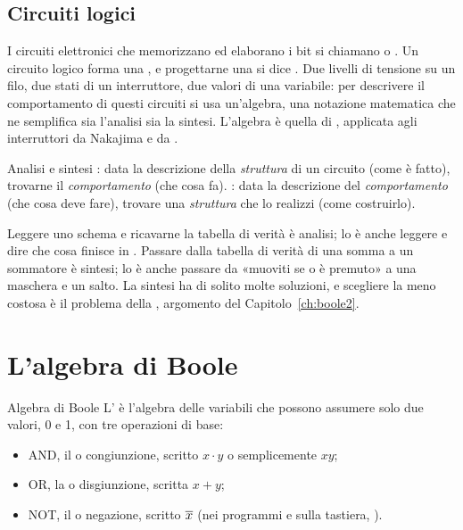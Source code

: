 \subsection{Circuiti logici}

I circuiti elettronici che memorizzano ed elaborano i bit si chiamano
 o . Un circuito logico
forma una , e progettarne una si dice
. Due livelli di tensione su un filo, due stati di un
interruttore, due valori di una variabile: per descrivere il comportamento di
questi circuiti si usa un'algebra, una notazione matematica che ne semplifica
sia l'analisi sia la sintesi. L'algebra è quella di \citet{boole1854},
applicata agli interruttori da Nakajima e da \citet{shannon1938}.

\begin{definition}{Analisi e sintesi}
: data la descrizione della \emph{struttura} di un circuito
(come è fatto), trovarne il \emph{comportamento} (che cosa fa).
: data la descrizione del \emph{comportamento} (che cosa deve
fare), trovare una \emph{struttura} che lo realizzi (come costruirlo).
\end{definition}

Leggere uno schema e ricavarne la tabella di verità è analisi; lo è anche
leggere  e dire che cosa finisce in . Passare
dalla tabella di verità di una somma a un sommatore è sintesi; lo è anche
passare da «muoviti se  o  è premuto» a una maschera e un
salto. La sintesi ha di solito molte soluzioni, e scegliere la meno costosa è
il problema della , argomento del
Capitolo~\ref{ch:boole2}.

\section{L'algebra di Boole}

\begin{definition}{Algebra di Boole}
L' è l'algebra delle variabili che possono assumere solo
due valori, 0 e 1, con tre operazioni di base:
\begin{itemize}[nosep]
\item AND, il  o congiunzione, scritto $x\cdot y$ o
  semplicemente $xy$;
\item OR, la  o disgiunzione, scritta $x+y$;
\item NOT, il  o negazione, scritto $\overline{x}$ (nei
  programmi e sulla tastiera, ).
\end{itemize}
\end{definition}

